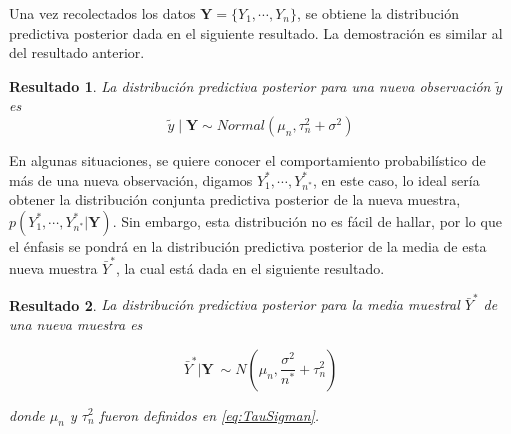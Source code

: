 \documentclass[
  10pt,
  spanish,
]{book}
\newtheorem{proposition}{Resultado}[chapter]
\theoremstyle{definition}
\theoremstyle{definition}
\theoremstyle{definition}
\theoremstyle{definition}
\theoremstyle{remark}
\begin{document}
Una vez recolectados los datos \(\mathbf{Y}=\{Y_1,\cdots,Y_n\}\), se obtiene la distribución predictiva posterior dada en el siguiente resultado. La demostración es similar al del resultado anterior.

\begin{proposition}
\protect\hypertarget{prp:unnamed-chunk-71}{}{\label{prp:unnamed-chunk-71} }La distribución predictiva posterior para una nueva observación \(\tilde{y}\) es
\begin{equation*}
\tilde{y} \mid \mathbf{Y} \sim Normal (\mu_n, \tau_n^2+\sigma^2)
\end{equation*}
\end{proposition}

En algunas situaciones, se quiere conocer el comportamiento probabilístico de más de una nueva observación, digamos \(Y_1^*,\cdots,Y_{n^*}^*\), en este caso, lo ideal sería obtener la distribución conjunta predictiva posterior de la nueva muestra, \(p(Y_1^*,\cdots,Y_{n^*}^*|\mathbf{Y})\). Sin embargo, esta distribución no es fácil de hallar, por lo que el énfasis se pondrá en la distribución predictiva posterior de la media de esta nueva muestra \(\bar{Y}^*\), la cual está dada en el siguiente resultado.

\begin{proposition}
\protect\hypertarget{prp:PredNorm}{}{\label{prp:PredNorm} }La distribución predictiva posterior para la media muestral \(\bar{Y}^*\) de una nueva muestra es

\begin{equation*}
\bar{Y}^*|\mathbf{Y}\ \sim N\left(\mu_n, \frac{\sigma^2}{n^*}+\tau^2_n\right)
\end{equation*}

donde \(\mu_n\) y \(\tau^2_n\) fueron definidos en \eqref{eq:TauSigman}.
\end{proposition}
\end{document}
